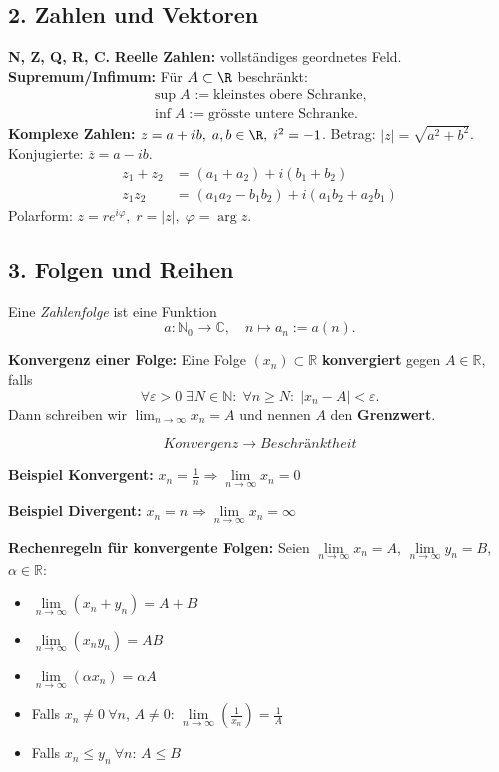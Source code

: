 \subsection{2. Zahlen und Vektoren}
\textbf{N, Z, Q, R, C.}  
\textbf{Reelle Zahlen:} vollständiges geordnetes Feld.  
\textbf{Supremum/Infimum:} Für $A\subset \R$ beschränkt:  
\begin{align*}
\sup A:=\text{kleinstes obere Schranke},\\
\inf A:=\text{grösste untere Schranke}.
\end{align*}
\textbf{Komplexe Zahlen:} $z=a+ib,\;a,b\in\R,\;i^2=-1$.  
Betrag: $|z|=\sqrt{a^2+b^2}$.  
Konjugierte: $\overline z=a-ib$.  
\begin{align*}
z_1 + z_2 &= (a_1 + a_2) + i(b_1 + b_2) \\
z_1 z_2 &= (a_1 a_2 - b_1 b_2) + i(a_1 b_2 + a_2 b_1)
\end{align*}
Polarform: $z=r e^{i\varphi},\;r=|z|,\;\varphi=\arg z$.

\subsection{3. Folgen und Reihen}  
Eine \emph{ Zahlenfolge} ist eine Funktion  
\[
a : \mathbb{N}_0 \to \mathbb{C}, \quad n \mapsto a_n := a(n).
\]  

\textbf{Konvergenz einer Folge:}  
Eine Folge \( (x_n) \subset \mathbb{R} \) \textbf{konvergiert} gegen \( A \in \mathbb{R} \), falls  
\[
\forall \varepsilon > 0\; \exists N \in \mathbb{N}:\; \forall n \geq N:\; |x_n - A| < \varepsilon.
\]  
Dann schreiben wir \( \lim_{n \to \infty} x_n = A \) und nennen \( A \) den \textbf{Grenzwert}.

\[
Konvergenz \to Beschränktheit
\]  

\textbf{Beispiel Konvergent:} \( x_n = \frac{1}{n} \Rightarrow \lim\limits_{n \to \infty} x_n = 0 \)

\textbf{Beispiel Divergent:} \( x_n = n \Rightarrow \lim\limits_{n \to \infty} x_n = \infty \)

\textbf{Rechenregeln für konvergente Folgen:}  
Seien \( \lim\limits_{n \to \infty} x_n = A \), \( \lim\limits_{n \to \infty} y_n = B \), \( \alpha \in \mathbb{R} \):

\begin{itemize}
  \item \( \lim\limits_{n \to \infty} (x_n + y_n) = A + B \)
  \item \( \lim\limits_{n \to \infty} (x_n y_n) = AB \)
  \item \( \lim\limits_{n \to \infty} (\alpha x_n) = \alpha A \)
  \item Falls \( x_n \neq 0\ \forall n \), \( A \neq 0 \):  
        \( \lim\limits_{n \to \infty} \left( \frac{1}{x_n} \right) = \frac{1}{A} \)
  \item Falls \( x_n \leq y_n\ \forall n \): \( A \leq B \)
\end{itemize}


